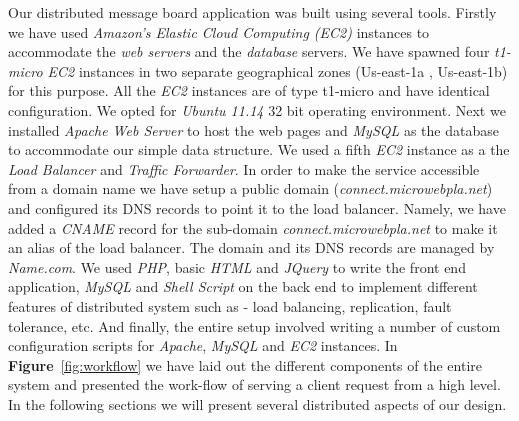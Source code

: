 \documentclass[12pt]{article}
\begin{document}
Our distributed message board application was built using several tools. Firstly we have used \emph{Amazon's Elastic Cloud Computing (EC2)} \cite{ec2} instances to accommodate the \emph{web servers} and the \emph{database} servers. We have spawned four  \emph{t1-micro EC2} \cite{t1micro} instances in two separate geographical zones (Us-east-1a , Us-east-1b) for this purpose. All the \emph{EC2} instances are of type t1-micro and have identical configuration. We opted for \emph{Ubuntu 11.14} 32 bit operating environment. Next we installed \emph{Apache Web Server} \cite{apache} to host the web pages and \emph{MySQL} \cite{mysql} as the database to accommodate our simple data structure. We used a fifth \emph{EC2} instance as a the \emph{Load Balancer} and \emph{Traffic Forwarder}. In order to make the service accessible from a domain name we have setup a public domain (\emph{connect.microwebpla.net}) and configured its DNS records to point it to the load balancer. Namely, we have added a \emph{CNAME} \cite{cname} record for the sub-domain \emph{connect.microwebpla.net} to make it an alias of the load balancer. The domain and its DNS records are managed by \emph{Name.com}. We used \emph{PHP}, basic \emph{HTML} and \emph{JQuery} \cite{jquery} to write the front end application, \emph{MySQL} and \emph{Shell Script} on the back end to implement different features of distributed system such as - load balancing, replication, fault tolerance, etc. And finally, the entire setup involved writing a number of custom configuration scripts for \emph{Apache}, \emph{MySQL} and \emph{EC2} instances. In  \textbf{Figure}~\ref{fig:workflow} we have laid out the different components of the entire system and presented the work-flow of serving a client request from a high level. In the following sections we will present several distributed aspects of our design.
\end{document}
